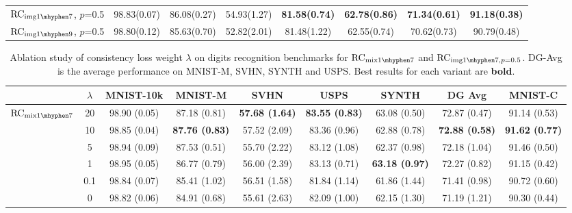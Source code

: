 \documentclass{article} \usepackage{iclr2021_conference,times}
\begin{document}
\begin{table}[htp]
\begin{tabular}{l|c|ccccc|c}
		$\text{RC}_{\text{img}{1\mhyphen7}}$\tiny, $p$=0.5 & 98.83\tiny(0.07) & 86.08\tiny(0.27)          & 54.93\tiny(1.27)          & \textbf{81.58\tiny(0.74)} & \textbf{62.78\tiny(0.86)} & \textbf{71.34\tiny(0.61)} & \textbf{91.18\tiny(0.38)} \\
		$\text{RC}_{\text{img}{1\mhyphen9}}$\tiny, $p$=0.5 & 98.80\tiny(0.12) & 85.63\tiny(0.70)          & 52.82\tiny(2.01)          & 81.48\tiny(1.22)          & 62.55\tiny(0.74)          & 70.62\tiny(0.73)          & 90.79\tiny(0.48)              \\
\bottomrule
	\end{tabular}
\end{table}
\begin{table}[htp]
	\small
	\centering
	\setlength{\tabcolsep}{3pt}
	\caption{Ablation study of consistency loss weight $\lambda$ on digits recognition benchmarks for $\text{RC}_{\text{mix}1\mhyphen7}$ and $\text{RC}_{\text{img}1\mhyphen7, p=0.5}$. DG-Avg is the average performance on MNIST-M, SVHN, SYNTH and USPS. Best results for each variant are \textbf{bold}.}
	\label{digits-consistency}
	\begin{tabular}{l|c|c|ccccc|c}
		\toprule
		& $\lambda$& MNIST-10k    & MNIST-M    & SVHN        & USPS        & SYNTH       & DG Avg         & MNIST-C     \\
		\midrule
		\multirow{6}{*}{$\text{RC}_{\text{mix}1\mhyphen7}$} & 20   & 98.90 \tiny(0.05) & 87.18 \tiny(0.81)          & \textbf{57.68 \tiny(1.64)} & \textbf{83.55 \tiny(0.83)} & 63.08 \tiny(0.50)          & 72.87 \tiny(0.47)          & 91.14 \tiny(0.53)          \\
		& 10   & 98.85 \tiny(0.04) & \textbf{87.76 \tiny(0.83)} & 57.52 \tiny(2.09)          & 83.36 \tiny(0.96)          & 62.88 \tiny(0.78)          & \textbf{72.88 \tiny(0.58)} & \textbf{91.62 \tiny(0.77)} \\
		& 5    & 98.94 \tiny(0.09) & 87.53 \tiny(0.51)          & 55.70 \tiny(2.22)          & 83.12 \tiny(1.08)          & 62.37 \tiny(0.98)          & 72.18 \tiny(1.04)          & 91.46 \tiny(0.50)          \\
		& 1    & 98.95 \tiny(0.05) & 86.77 \tiny(0.79)          & 56.00 \tiny(2.39)          & 83.13 \tiny(0.71)          & \textbf{63.18 \tiny(0.97)} & 72.27 \tiny(0.82)          & 91.15 \tiny(0.42)          \\
		& 0.1  & 98.84 \tiny(0.07) & 85.41 \tiny(1.02)          & 56.51 \tiny(1.58)          & 81.84 \tiny(1.14)          & 61.86 \tiny(1.44)          & 71.41 \tiny(0.98)          & 90.72 \tiny(0.60)          \\
		& 0    & 98.82 \tiny(0.06) & 84.91 \tiny(0.68)          & 55.61 \tiny(2.63)          & 82.09 \tiny(1.00)          & 62.15 \tiny(1.30)          & 71.19 \tiny(1.21)          & 90.30 \tiny(0.44)          \\
		

\end{tabular}
\end{table}
\end{document}
